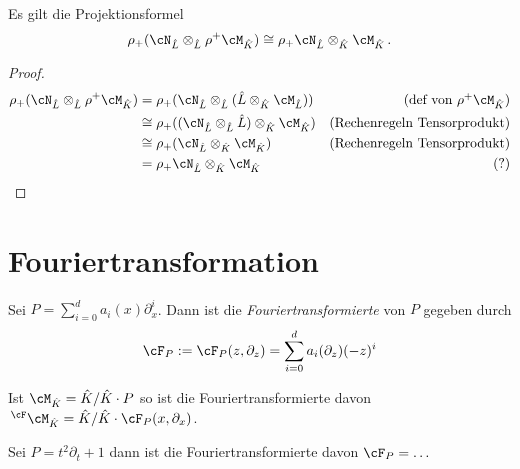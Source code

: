 \begin{thm} \label{thm:Projektionsformel}
\cite[1.a]{sabbah_Fourier-local}
Es gilt die Projektionsformel
\begin{equation} \label{eq:Projektionsformel}
\rho_+(\cN_{\hat L}\otimes_{\hat L}\rho^+\cM_{\hat K}) \cong
\rho_+\cN_{\hat L}\otimes_{\hat K}\cM_{\hat K}\,.
\end{equation}
\end{thm}
\begin{proof}
\begin{align*}
\rho_+(\cN_{\hat L}\otimes_{\hat L}\rho^+\cM_{\hat K}) &=
\rho_+(\cN_{\hat L}\otimes_{\hat L}(\hat L\otimes_{\hat K}\cM_{\hat L}))
  & \mbox{(def von $\rho^+\cM_{\hat K}$)}\\
&\cong\rho_+((\cN_{\hat L}\otimes_{\hat L}\hat L)\otimes_{\hat K}\cM_{\hat K})
  & \mbox{(Rechenregeln Tensorprodukt)}\\ %
&\cong \rho_+(\cN_{\hat L}\otimes_{\hat K}\cM_{\hat K})
  & \mbox{(Rechenregeln Tensorprodukt)}\\
&= \rho_+\cN_{\hat L}\otimes_{\hat K}\cM_{\hat K}
  & \mbox{(?)}
\end{align*}
\end{proof}

\begin{comment}
Sei $\rho(u)=u^p=t$ und $\phi(t)$ gegeben.
\begin{align*}
\rho^+\sE^{\phi(t)}&=\sE^{\phi(\rho(u))}=\sE^{\phi(u^p)}\\
\rho^+\rho_+\sE^{\phi(u)}
&=\underset{\zeta\in\mu_p}{\bigoplus}\sE^{\phi(\zeta\cdot u)}\\
\end{align*}
\end{comment}

\section{Fouriertransformation}
\begin{defn}[Fouriertransformation]
\cite[Def 3.1]{Bloch_localfourier}
\cite{GarciaLopez04}
\cite[Def 6.1]{ZulaBarbara}
Sei $P=\sum_{i=0}^da_i(x)\partial_x^i$. Dann ist die
\emph{Fouriertransformierte} von
$P$ gegeben durch
\[
\cF_P:=\cF_P(z,\partial_z)=\sum_{i=0}^da_i(\partial_z)(-z)^i
\]
\end{defn}
\begin{defn}
Ist $\cM_{\hat K}=\hat K / \hat K \cdot P$ so ist die Fouriertransformierte
davon $\,^\cF\cM_{\hat K}=\hat K / \hat K \cdot \cF_P(x,\partial_x)$.
\end{defn}
\begin{exmp}
Sei $P=t^2\partial_t+1$ dann ist die Fouriertransformierte davon $\cF_P=\dots$
\begin{comment}
TODO: hier weiter
\end{comment}
\end{exmp}

